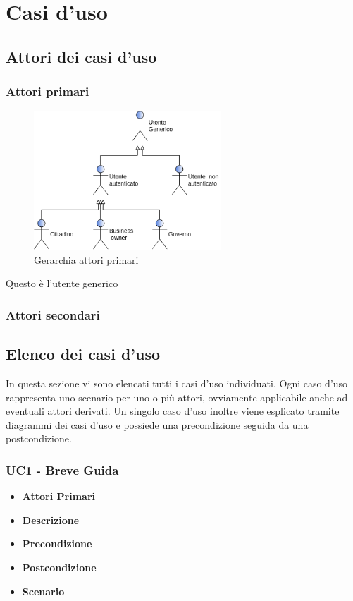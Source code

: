 \section{Casi d'uso} 
\subsection{Attori dei casi d'uso}
\subsubsection{Attori primari}
\begin{figure}[h]
	\includegraphics[width=7cm]{res/images/attori_primari.png}
	\centering
	\caption{Gerarchia attori primari}

\end{figure}
\begin{description}[style=nextline]
	\item[Utente Generico]
	Questo è l'utente generico
\end{description}
\subsubsection{Attori secondari}
\subsection{Elenco dei casi d'uso}
In questa sezione vi sono elencati tutti i casi d'uso individuati. Ogni caso d'uso rappresenta uno scenario per uno o più attori, ovviamente applicabile anche ad eventuali attori derivati. Un singolo caso d'uso inoltre viene esplicato tramite diagrammi dei casi d'uso e possiede una precondizione seguida da una postcondizione.

\subsubsection{UC1 - Breve Guida}
\begin{itemize}
	\item \textbf{Attori Primari}
	\item \textbf{Descrizione}
	\item \textbf{Precondizione}
	\item \textbf{Postcondizione}
	\item \textbf{Scenario}
\end{itemize}
